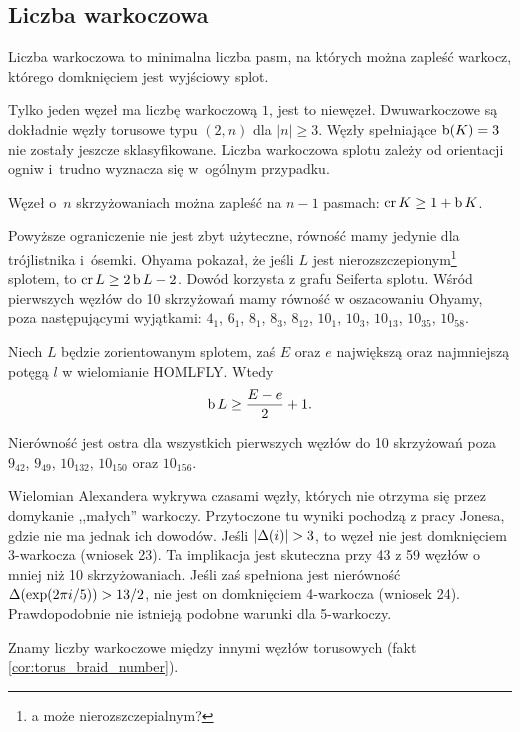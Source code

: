 
\subsection{Liczba warkoczowa} %

\begin{definition}
\label{def:braid_number}%
    Liczba warkoczowa to minimalna liczba pasm, na których można zapleść warkocz, którego domknięciem jest wyjściowy splot.
\end{definition}

Tylko jeden węzeł ma liczbę warkoczową $1$, jest to niewęzeł.
Dwuwarkoczowe są dokładnie węzły torusowe typu $(2, n)$ dla $|n| \ge 3$.
Węzły spełniające $\operatorname{b} (K) = 3$ nie zostały jeszcze sklasyfikowane.
Liczba warkoczowa splotu zależy od orientacji ogniw i~trudno wyznacza się w~ogólnym przypadku.

\begin{proposition}
    Węzeł o~$n$ skrzyżowaniach można zapleść na $n - 1$ pasmach: $\operatorname{cr} K \ge 1 + \operatorname{b} K$.
\end{proposition}

Powyższe ograniczenie nie jest zbyt użyteczne, równość mamy jedynie dla trójlistnika i~ósemki.
Ohyama pokazał, że jeśli $L$ jest nierozszczepionym\footnote{a może nierozszczepialnym?} splotem, to $\operatorname{cr} L \ge 2 \operatorname{b} L - 2$.
Dowód korzysta z grafu Seiferta splotu.
Wśród pierwszych węzłów do 10 skrzyżowań mamy równość w oszacowaniu Ohyamy, poza następującymi wyjątkami: $4_1$, $6_1$, $8_1$, $8_3$, $8_{12}$, $10_1$, $10_3$, $10_{13}$, $10_{35}$, $10_{58}$.

\begin{proposition}
    Niech $L$ będzie zorientowanym splotem, zaś $E$ oraz $e$ największą oraz najmniejszą potęgą $l$ w wielomianie HOMLFLY.
    Wtedy
    \begin{equation}
        \operatorname{b} L \ge \frac{E-e}{2} + 1.
    \end{equation}
\end{proposition}

Nierówność jest ostra dla wszystkich pierwszych węzłów do 10 skrzyżowań poza $9_{42}$, $9_{49}$, $10_{132}$, $10_{150}$ oraz $10_{156}$.

Wielomian Alexandera wykrywa czasami węzły, których nie otrzyma się przez domykanie ,,małych'' warkoczy.
Przytoczone tu wyniki pochodzą z pracy \cite{jones85} Jonesa, gdzie nie ma jednak ich dowodów.
Jeśli $|\Delta(i)| > 3$, to węzeł nie jest domknięciem 3-warkocza (wniosek 23).
Ta implikacja jest skuteczna przy 43 z 59 węzłów o mniej niż 10 skrzyżowaniach.
Jeśli zaś spełniona jest nierówność $\Delta (\exp (2\pi i / 5)) > 13/2$, nie jest on domknięciem 4-warkocza (wniosek 24).
Prawdopodobnie nie istnieją podobne warunki dla 5-warkoczy.

Znamy liczby warkoczowe między innymi węzłów torusowych (fakt \ref{cor:torus_braid_number}).


